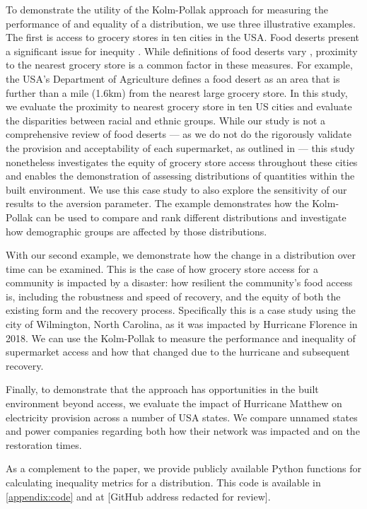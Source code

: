 \documentclass[final,3p,times,onecolumn,sort&compress]{elsarticle}
\begin{document}
To demonstrate the utility of the Kolm-Pollak approach for measuring the performance of and equality of a distribution, we use three illustrative examples.
The first is access to grocery stores in ten cities in the USA.
Food deserts present a significant issue for inequity \citep{Kolak2018-az, Walker2010-ch}.
While definitions of food deserts vary \citep{Walker2010-ch}, proximity to the nearest grocery store is a common factor in these measures.
For example, the USA's Department of Agriculture defines a food desert as an area that is further than a mile (1.6km) from the nearest large grocery store.
In this study, we evaluate the proximity to nearest grocery store in ten US cities and evaluate the disparities between racial and ethnic groups.
While our study is not a comprehensive review of food deserts --- as we do not do the rigorously validate the provision and acceptability of each supermarket, as outlined in \cite{Kolak2018-az} --- this study nonetheless investigates the equity of grocery store access throughout these cities and enables the demonstration of assessing distributions of quantities within the built environment.
We use this case study to also explore the sensitivity of our results to the aversion parameter.
The example demonstrates how the Kolm-Pollak can be used to compare and rank different distributions and investigate how demographic groups are affected by those distributions.

With our second example, we demonstrate how the change in a distribution over time can be examined.
This is the case of how grocery store access for a community is impacted by a disaster: how resilient the community's food access is, including the robustness and speed of recovery, and the equity of both the existing form and the recovery process. Specifically this is a case study using the city of Wilmington, North Carolina, as it was impacted by Hurricane Florence in 2018.
We can use the Kolm-Pollak to measure the performance and inequality of supermarket access and how that changed due to the hurricane and subsequent recovery.

Finally, to demonstrate that the approach has opportunities in the built environment beyond access, we evaluate the impact of Hurricane Matthew on electricity provision across a number of USA states.
We compare unnamed states and power companies regarding both how their network was impacted and on the restoration times.

As a complement to the paper, we provide publicly available Python functions for calculating inequality metrics for a distribution. 
This code is available in \ref{appendix:code} and at [GitHub address redacted for review].
\end{document}
